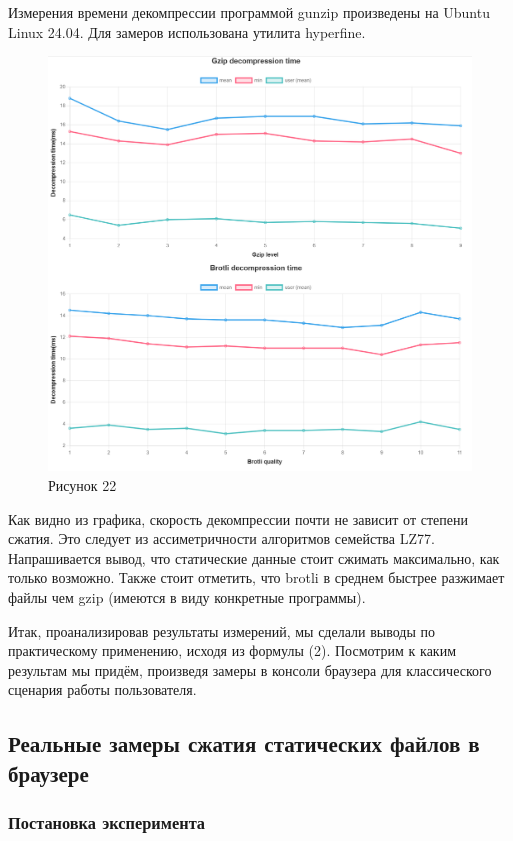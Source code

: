 \documentclass[12pt]{article}
\begin{document}
Измерения времени декомпрессии программой gunzip произведены на Ubuntu Linux 24.04. Для замеров использована утилита hyperfine.

\begin{figure}[H]
    \centering
    \includegraphics[width=1\textwidth]{../images/Decompression_time.png}
    \caption{Рисунок 22}
\end{figure}

Как видно из графика, скорость декомпрессии почти не зависит от степени сжатия. Это следует из ассиметричности алгоритмов семейства LZ77.
Напрашивается вывод, что статические данные стоит сжимать максимально, как только возможно.
Также стоит отметить, что brotli в среднем быстрее разжимает файлы чем gzip (имеются в виду конкретные программы).

Итак, проанализировав результаты измерений, мы сделали выводы по практическому применению, исходя из формулы (2).
Посмотрим к каким результам мы придём, произведя замеры в консоли браузера для классического сценария работы пользователя. 

\subsection{Реальные замеры сжатия статических файлов в браузере}

\subsubsection{Постановка эксперимента}
\end{document}
